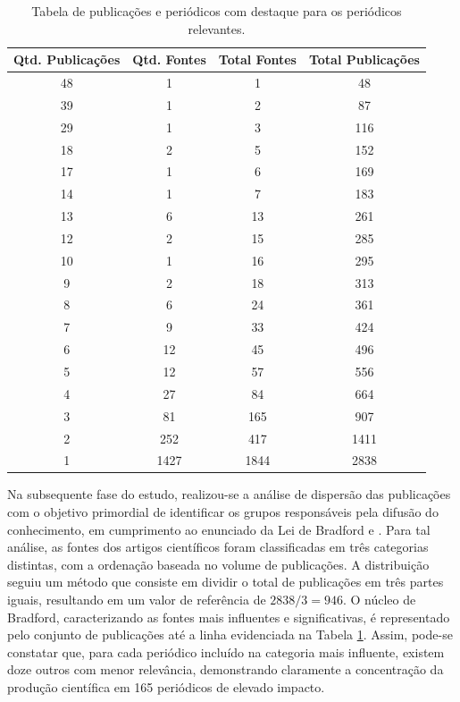 \documentclass[openany,oneside,a4paper,11pt]{extarticle}
\begin{document}
\begin{table}[H]
    \centering
    \begin{tabular}{cccc}
        \hline
        Qtd. Publicações & Qtd. Fontes & Total Fontes & Total Publicações \\
        \hline
        \rowcolor{red!30} 48  & 1    & 1    & 48   \\
        \rowcolor{red!30} 39  & 1    & 2    & 87   \\
        \rowcolor{red!30} 29  & 1    & 3    & 116  \\
        \rowcolor{red!30} 18  & 2    & 5    & 152  \\
        \rowcolor{red!30} 17  & 1    & 6    & 169  \\
        \rowcolor{red!30} 14  & 1    & 7    & 183  \\
        \rowcolor{red!30} 13  & 6    & 13   & 261  \\
        \rowcolor{red!30} 12  & 2    & 15   & 285  \\
        \rowcolor{red!30} 10  & 1    & 16   & 295  \\
        \rowcolor{red!30} 9   & 2    & 18   & 313  \\
        \rowcolor{red!30} 8   & 6    & 24   & 361  \\
        \rowcolor{red!30} 7   & 9    & 33   & 424  \\
        \rowcolor{red!30} 6   & 12   & 45   & 496  \\
        \rowcolor{red!30} 5   & 12   & 57   & 556  \\
        \rowcolor{red!30} 4   & 27   & 84   & 664  \\
        \rowcolor{red!30} 3   & 81   & 165  & 907  \\
        2   & 252  & 417  & 1411 \\
        1   & 1427 & 1844 & 2838 \\
        \hline
    \end{tabular}
    \caption{Tabela de publicações e periódicos com destaque para os periódicos relevantes.}
    \label{tab:resumo_qtd_publicacoes}
\end{table}

Na subsequente fase do estudo, realizou-se a análise de dispersão das publicações com o objetivo primordial de identificar os grupos responsáveis pela difusão do conhecimento, em cumprimento ao enunciado da Lei de Bradford \cite{gracio2020analises} e \cite{lousada2012produccao}. Para tal análise, as fontes dos artigos científicos foram classificadas em três categorias distintas, com a ordenação baseada no volume de publicações. A distribuição seguiu um método que consiste em dividir o total de publicações em três partes iguais, resultando em um valor de referência de $2838/3 = 946$. O núcleo de Bradford, caracterizando as fontes mais influentes e significativas, é representado pelo conjunto de publicações até a linha evidenciada na Tabela \ref{tab:resumo_qtd_publicacoes}. Assim, pode-se constatar que, para cada periódico incluído na categoria mais influente, existem doze outros com menor relevância, demonstrando claramente a concentração da produção científica em 165 periódicos de elevado impacto.
\end{document}
